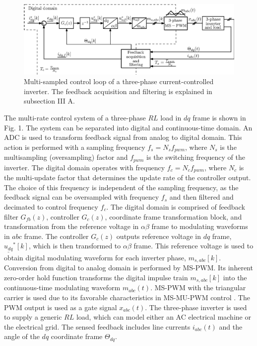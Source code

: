 \documentclass[conference]{IEEEtran}
\begin{document}
\begin{figure}[t!]
    \centerline{\includegraphics[width=0.8\linewidth]{figures/schematic.eps}}
    \caption{Multi-sampled control loop of a three-phase current-controlled inverter. The feedback acquisition and filtering is explained in subsection III A.}
    \label{fig:MSControl}
\end{figure}

The multi-rate control system of a three-phase $RL$ load in $dq$ frame is shown in Fig. 1. The system can be separated into digital and continuous-time domain. An ADC is used to transform feedback signal from analog to digital domain. This action is performed with a sampling frequency $f_s = N_s f_{pwm}$, where $N_s$ is the multisampling (oversampling) factor and $f_{pwm}$ is the switching frequency of the inverter. The digital domain operates with frequency $f_c = N_c f_{pwm}$, where $N_c$ is the multi-update factor that determines the update rate of the controller output. The choice of this frequency is independent of the sampling frequency, as the feedback signal can be oversampled with frequency $f_s$ and then filtered and decimated to control frequency $f_c$. The digital domain is comprised of feedback filter $G_{fb}(z)$, controller $G_c(z)$, coordinate frame transformation block, and transformation from the reference voltage in $\alpha \beta$ frame to modulating waveforms in $abc$ frame. The controller $G_c(z)$ outputs reference voltage in $dq$ frame, $\underline{u_{dq}}^*[k]$, which is then transformed to $\alpha \beta$ frame. This reference voltage is used to obtain digital modulating waveform for each inverter phase, $m_{s,abc}[k]$. Conversion from digital to analog domain is performed by MS-PWM. Its inherent zero-order hold function transforms the digital impulse train $m_{s,abc}[k]$ into the continuous-time modulating waveform $m_{abc}(t)$. MS-PWM with the triangular carrier is used due to its favorable characteristics in MS-MU-PWM control \cite{corradini2018}. The PWM output is used as a gate signal $x_{abc}(t)$. The three-phase inverter is used to supply a generic $RL$ load, which can model either an AC electrical machine or the electrical grid. The sensed feedback includes line currents $i_{abc}(t)$ and the angle of the $dq$ coordinate frame $\Theta_{dq}$. 
\end{document}
